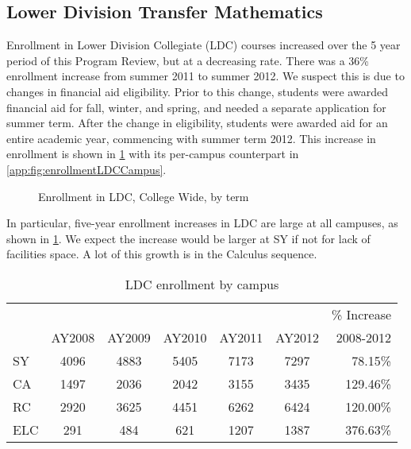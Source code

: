 \subsection{Lower Division Transfer Mathematics}
Enrollment in Lower Division Collegiate (LDC) courses increased over the 5
year period of this Program Review, but at a decreasing rate. There was a 36\%
enrollment increase from summer 2011 to summer 2012. We suspect this is due to
changes in financial aid eligibility. Prior to this change, students were
awarded financial aid for fall, winter, and spring, and needed a separate
application for summer term.  After the change in eligibility, students were
awarded aid for an entire academic year, commencing with summer term 2012.
This increase in enrollment is shown in \cref{needs:fig:enrollmentLDCTerm} with
its per-campus counterpart in \vref{app:fig:enrollmentLDCCampus}.

\begin{figure}[!htb]
	\centering
	
	\caption{Enrollment in LDC, College Wide, by term}
	\label{needs:fig:enrollmentLDCTerm}
\end{figure}

In particular, five-year enrollment increases  in LDC are large at all
campuses, as shown in \cref{needs:tab:LDCenrollmentCampus}.  We expect the
increase would be larger at SY if not for lack of facilities space. A lot of
this growth is in the Calculus sequence.   

\begin{table}[!htb]
	\centering
	\caption{LDC enrollment by campus}
	\label{needs:tab:LDCenrollmentCampus}
	\begin{tabular}{l*{5}{c}r}
		\toprule
		    &        &        &        &        &        & \% Increase \\
		    & AY2008 & AY2009 & AY2010 & AY2011 & AY2012 & 2008-2012   \\
		\midrule
		SY  & 4096   & 4883   & 5405   & 7173   & 7297   & 78.15\%     \\
		CA  & 1497   & 2036   & 2042   & 3155   & 3435   & 129.46\%    \\
		RC  & 2920   & 3625   & 4451   & 6262   & 6424   & 120.00\%    \\
		ELC & 291    & 484    & 621    & 1207   & 1387   & 376.63\%    \\
		\bottomrule
	\end{tabular}
\end{table}

